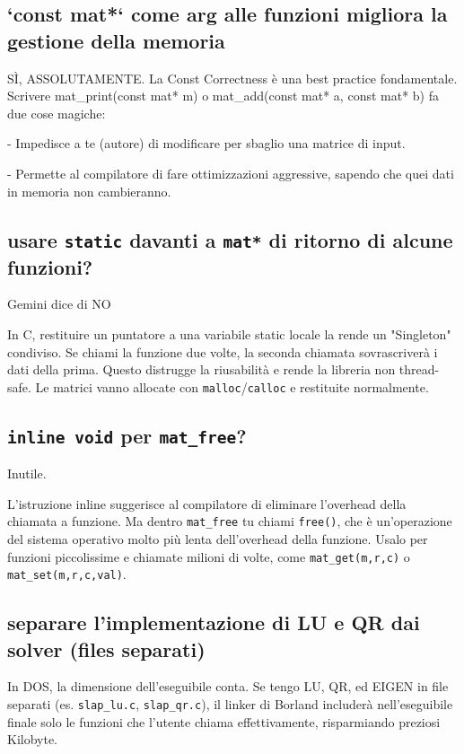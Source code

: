 \documentclass[10pt]{article}
\begin{document}
\subsection{`const mat*` come arg alle funzioni migliora la gestione della memoria}

SÌ, ASSOLUTAMENTE. La Const Correctness è una best practice fondamentale. Scrivere mat\_print(const mat* m) o mat\_add(const mat* a, const mat* b) fa due cose magiche:

	- Impedisce a te (autore) di modificare per sbaglio una matrice di input.

	- Permette al compilatore di fare ottimizzazioni aggressive, sapendo che quei dati in memoria non cambieranno.

\subsection{usare \texttt{static} davanti a \texttt{mat*} di ritorno di alcune funzioni?}

Gemini dice di NO

In C, restituire un puntatore a una variabile static locale la rende un "Singleton" condiviso. Se chiami la funzione due volte, la seconda chiamata sovrascriverà i dati della prima. Questo distrugge la riusabilità e rende la libreria non thread-safe. Le matrici vanno allocate con \texttt{malloc}/\texttt{calloc} e restituite normalmente.

\subsection{\texttt{inline void} per \texttt{mat\_free}?}

Inutile. 

L'istruzione inline suggerisce al compilatore di eliminare l'overhead della chiamata a funzione. Ma dentro \texttt{mat\_free} tu chiami \texttt{free()}, che è un'operazione del sistema operativo molto più lenta dell'overhead della funzione. Usalo per funzioni piccolissime e chiamate milioni di volte, come \texttt{mat\_get(m,r,c)} o \texttt{mat\_set(m,r,c,val)}.


\subsection{separare l'implementazione di LU e QR dai solver (files separati)}

In DOS, la dimensione dell'eseguibile conta. Se tengo LU, QR, ed EIGEN in file separati (es. \texttt{slap\_lu.c}, \texttt{slap\_qr.c}), il linker di Borland includerà nell'eseguibile finale solo le funzioni che l'utente chiama effettivamente, risparmiando preziosi Kilobyte.
\end{document}
